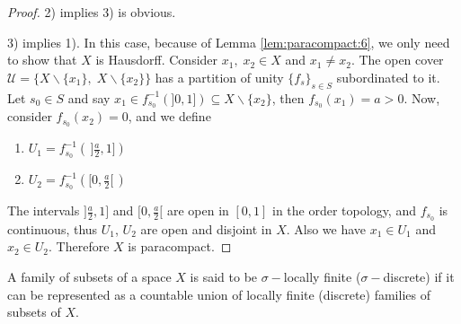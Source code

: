 \documentclass[12pt,oneside,english]{amsbook}
\numberwithin{equation}{section} %
\numberwithin{figure}{section} %
\theoremstyle{plain}
\numberwithin{section}{chapter}
\theoremstyle{plain}
\begin{document}
\begin{proof}
  2) implies 3) is obvious.
  
  3) implies 1). In this case, because of Lemma \ref{lem:paracompact:6}, we only need to show that $X$ is Hausdorff. Consider $x_{1}, \; x_{2} \in X$ and $x_{1} \neq x_{2}$. The open cover $\mathcal{U} = \{X \backslash \{x_{1}\}, \; X \backslash \{x_{2}\} \}$ has a partition of unity $\{f_{s}\}_{s \in S}$ subordinated to it. Let $s_{0} \in S$ and say $x_1 \in f_{s_{0}}^{-1}(]0,1]) \subseteq X \backslash\{x_{2}\}$, then $f_{s_{0}}(x_{1}) = a > 0$. Now, consider $f_{s_{0}}(x_{2}) = 0$, and we define
  \begin{enumerate}
  \item $U_{1} = f_{s_{0}}^{-1}(\,]\frac{a}{2}, 1])$
  \item $U_{2} = f_{s_{0}}^{-1}([0, \frac{a}{2}[\,)$
  \end{enumerate}
  The intervals $] \frac{a}{2}, 1]$ and $[0, \frac{a}{2}[$ are open in $[0,1]$ in the order topology, and $f_{s_{0}}$ is continuous, thus $U_{1}$, $U_{2}$ are open and disjoint in $X$. Also we have $x_{1} \in U_{1}$ and $x_{2} \in U_{2}$. Therefore $X$ is paracompact.  
\end{proof}

A family of subsets of a space $X$ is said to be $\sigma-$locally finite ($\sigma-$discrete) if it can be represented as a countable union of locally finite (discrete) families of subsets of $X$.
\end{document}
